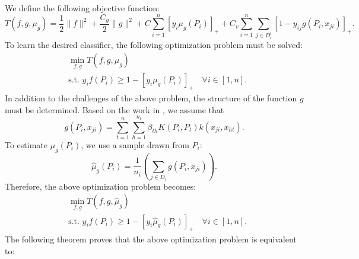 	We define the following objective function:
	\begin{equation}
		T(f, g, \mu_g) = \frac{1}{2}\|f\|^2 + \frac{C_g}{2}\|g\|^2 + C \sum_{i=1}^{n} \left[ y_i \mu_g(P_i) \right]_+ + C_v \sum_{i=1}^{n} \sum_{j \in D_i^l} \left[ 1 - y_{ij} g(P_i, x_{ji}) \right]_+.
	\end{equation}
	To learn the desired classifier, the following optimization problem must be solved:
	\begin{subequations}
		\label{eq:lupi-dist-opt}
		\begin{align}
			&\min_{f, g} T(f, g, \mu_g) \\
			&\text{s.t. } y_i f(P_i) \ge 1 - \left[ y_i \mu_g(P_i) \right]_+ \quad \forall i \in [1, n].
		\end{align}
	\end{subequations}
	In addition to the challenges of the above problem, the structure of the function $g$ must be determined. Based on the work in \cite{louizos2015learning}, we assume that
	\begin{equation}
		g(P_i, x_{ji}) = \sum_{t=1}^{n} \sum_{h=1}^{n_t} \beta_{th} K(P_i, P_t) k(x_{ji}, x_{ht}).
	\end{equation}
	To estimate $\mu_g(P_i)$, we use a sample drawn from $P_i$:
	\begin{equation}
		\hat{\mu}_g(P_i) = \frac{1}{n_i} \left( \sum_{j \in D_i} g(P_i, x_{ji}) \right).
	\end{equation}
	Therefore, the above optimization problem becomes:
	\begin{subequations}
		\label{eq:lupi-dist-opt-approx}
		\begin{align}
			&\min_{f, g} T(f, g, \hat{\mu}_g) \\
			&\text{s.t. } y_i f(P_i) \ge 1 - \left[ y_i \hat{\mu}_g(P_i) \right]_+ \quad \forall i \in [1, n].
		\end{align}
	\end{subequations}
	The following theorem proves that the above optimization problem is equivalent to:
	
